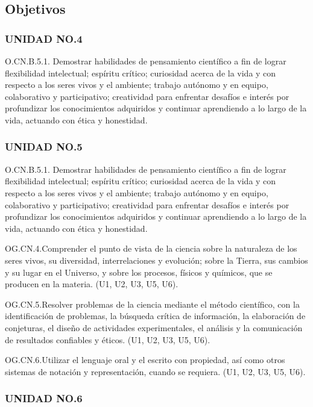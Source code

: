 \documentclass[a4paper, 12pt]{article}
\begin{document}
\subsection{Objetivos}

\subsubsection{UNIDAD NO.4}

O.CN.B.5.1. Demostrar habilidades de pensamiento científico a fin de lograr flexibilidad intelectual; espíritu crítico; curiosidad acerca de la vida y con respecto a los seres vivos y el ambiente; trabajo autónomo y en equipo, colaborativo y participativo; creatividad para enfrentar desafíos e interés por profundizar los conocimientos adquiridos y continuar aprendiendo a lo largo de la vida, actuando con ética y honestidad.

\subsubsection{UNIDAD NO.5}

O.CN.B.5.1. Demostrar habilidades de pensamiento científico a fin de lograr flexibilidad intelectual; espíritu crítico; curiosidad acerca de la vida y con respecto a los seres vivos y el ambiente; trabajo autónomo y en equipo, colaborativo y participativo; creatividad para enfrentar desafíos e interés por profundizar los conocimientos adquiridos y continuar aprendiendo a lo largo de la vida, actuando con ética y honestidad.

OG.CN.4.Comprender el punto de vista de la ciencia sobre la naturaleza de los seres vivos, su diversidad, interrelaciones y evolución; sobre la Tierra, sus cambios y su lugar en el Universo, y sobre los procesos, físicos y químicos, que se producen en la materia. (U1, U2, U3, U5, U6).

OG.CN.5.Resolver problemas de la ciencia mediante el método científico, con la identificación de problemas, la búsqueda crítica de información, la elaboración de conjeturas, el diseño de actividades experimentales, el análisis y la comunicación de resultados confiables y éticos. (U1, U2, U3, U5, U6).

OG.CN.6.Utilizar el lenguaje oral y el escrito con propiedad, así como otros sistemas de notación y representación, cuando se requiera. (U1, U2, U3, U5, U6).


\subsubsection{UNIDAD NO.6}
\end{document}
